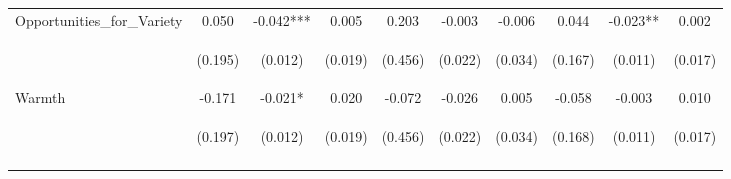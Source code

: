 \begin{tabular}{lccccccccc}
\noalign{\smallskip}Opportunities_for_Variety & 0.050 & -0.042*** & 0.005 & 0.203 & -0.003 & -0.006 & 0.044 & -0.023** & 0.002\\
 & \begin{footnotesize}(0.195)\end{footnotesize} & \begin{footnotesize}(0.012)\end{footnotesize} & \begin{footnotesize}(0.019)\end{footnotesize} & \begin{footnotesize}(0.456)\end{footnotesize} & \begin{footnotesize}(0.022)\end{footnotesize} & \begin{footnotesize}(0.034)\end{footnotesize} & \begin{footnotesize}(0.167)\end{footnotesize} & \begin{footnotesize}(0.011)\end{footnotesize} & \begin{footnotesize}(0.017)\end{footnotesize}\\
\noalign{\smallskip}Warmth & -0.171 & -0.021* & 0.020 & -0.072 & -0.026 & 0.005 & -0.058 & -0.003 & 0.010\\
 & \begin{footnotesize}(0.197)\end{footnotesize} & \begin{footnotesize}(0.012)\end{footnotesize} & \begin{footnotesize}(0.019)\end{footnotesize} & \begin{footnotesize}(0.456)\end{footnotesize} & \begin{footnotesize}(0.022)\end{footnotesize} & \begin{footnotesize}(0.034)\end{footnotesize} & \begin{footnotesize}(0.168)\end{footnotesize} & \begin{footnotesize}(0.011)\end{footnotesize} & \begin{footnotesize}(0.017)\end{footnotesize}\\
\noalign{\smallskip}\hline\end{tabular}\\
